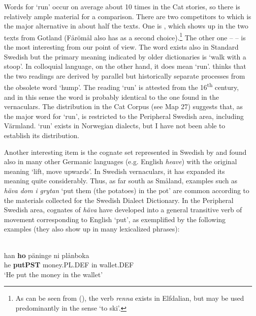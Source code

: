 Words for ‘run’ occur on average about 10 times in the Cat stories, so there is relatively ample material for a comparison. There are two competitors to which is the major alternative in about half the texts. One is , which shows up in the two texts from Gotland (Fårömål also has  as a second choice).\footnote{ As can be seen from (), the verb \textit{renna} exists in Elfdalian, but may be used predominantly in the sense ‘to ski’.} The other one –  – is the most interesting from our point of view. The word exists also in Standard Swedish but the primary meaning indicated by older dictionaries is ‘walk with a stoop’. In colloquial language, on the other hand, it does mean ‘run’. \citet[371]{Hellquist1922} thinks that the two readings are derived by parallel but historically separate processes from the obsolete word  ‘hump’. The reading ‘run’ is attested from the 16\textsuperscript{th} century, and in this sense the word is probably identical to the one found in the vernaculars. The distribution in the Cat Corpus (see Map 27) suggests that, as the major word for ‘run’,  is restricted to the Peripheral Swedish area, including Värmland.  ‘run’ exists in Norwegian dialects, but I have not been able to establish its distribution.




Another interesting item is the cognate set represented in Swedish by  and found also in many other Germanic languages (e.g. English \textit{heave}) with the original meaning ‘lift, move upwards’. In Swedish vernaculars, it has expanded its meaning quite considerably. Thus, as far south as Småland, examples such as \textit{häva dom i grytan} ‘put them (the potatoes) in the pot’ are common according to the materials collected for the Swedish Dialect Dictionary. In the Peripheral Swedish area, cognates\textit{ }of \textit{häva} have developed into a general transitive verb of movement corresponding to English ‘put’, as exemplified by the following examples (they also show up in many lexicalized phrases):



\ea\label{}
\\
\gll han  \textbf{ho} päninge  ni  plånboka\\
he  \textbf{putPST} money.PL.DEF  in  wallet.DEF\\
\glt ‘He put the money in the wallet’
\z

